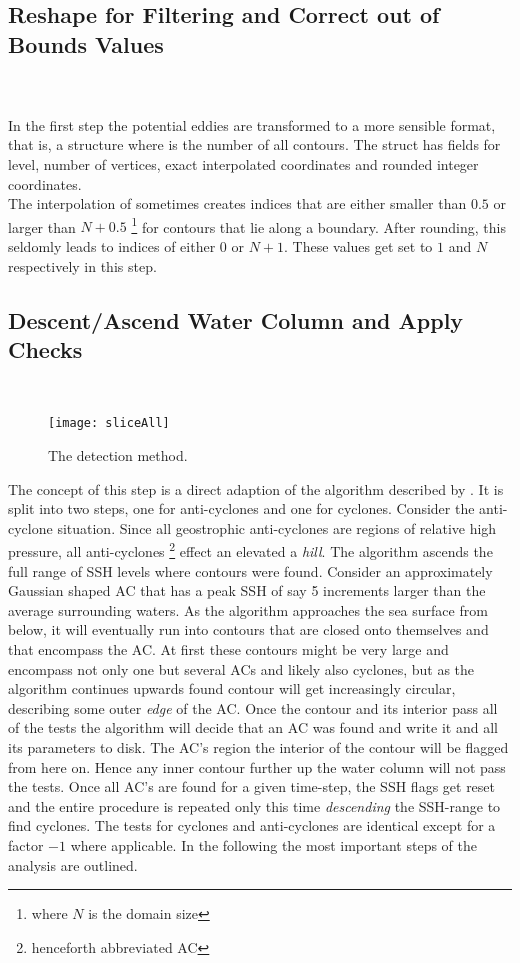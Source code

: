 \subsection*{Reshape for Filtering and Correct out of Bounds Values}
\\
\\
In the first step the potential eddies are transformed to a more sensible
format, that is, a structure  where 
is the number of all contours. The struct has fields for level, number of
vertices, exact \ie interpolated coordinates and rounded integer coordinates.\\
The interpolation of  sometimes creates indices that are
either smaller than $0.5$ or larger than $N+0.5$ \footnote{where $N$ is the
domain size} for contours that lie along a boundary. After rounding, this
seldomly leads to indices of either $0$ or $N+1$. These values get set to $1$
and $N$ respectively in this step.
\subsection*{Descent/Ascend Water Column and Apply Checks}
 \\
\begin{figure}
	\texttt{[image: sliceAll]}
	\caption{The detection method.}
	\label{fig:sliceAll}
\end{figure}
The concept of this step is a direct adaption of the algorithm described
by \cite{Chelton2011}. It is split into two steps, one for anti-cyclones and one
for cyclones. Consider \eg the anti-cyclone situation. Since all
geostrophic anti-cyclones are regions of relative high pressure, all
anti-cyclones \footnote{henceforth abbreviated AC} effect an elevated \SSH \ie
a \textit{hill}. The algorithm ascends the full range of SSH levels where
contours were found. Consider an approximately Gaussian shaped AC that has a
peak SSH of say 5 increments larger than the average surrounding waters.
As the algorithm approaches the sea surface from below, it will eventually run
into contours that are closed onto themselves and that encompass the AC. At
first these contours might be very large and encompass not only one but several
ACs and likely also cyclones, but as the algorithm continues upwards found
contour will get increasingly circular, describing some outer \textit{edge} of
the AC. Once the contour and its interior pass all of the tests the algorithm
will decide that an AC was found and write it and all its parameters to disk.
The AC's region \ie the interior of the contour will be flagged from here on.
Hence any inner contour further up the water column will not pass the tests.
Once all AC's are found for a given time-step, the SSH flags get reset and the
entire procedure is repeated only this time \textit{descending} the SSH-range to
find cyclones. The tests for cyclones and anti-cyclones are identical except for
a factor $-1$ where applicable. In the following the most important steps of the
analysis are
outlined.
